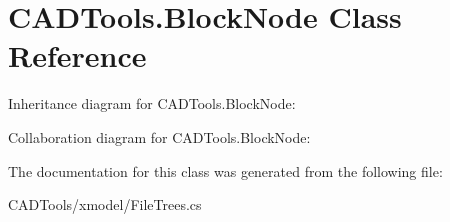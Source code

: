 \hypertarget{class_c_a_d_tools_1_1_block_node}{}\section{C\+A\+D\+Tools.\+Block\+Node Class Reference}
\label{class_c_a_d_tools_1_1_block_node}


Inheritance diagram for C\+A\+D\+Tools.\+Block\+Node\+:


Collaboration diagram for C\+A\+D\+Tools.\+Block\+Node\+:


The documentation for this class was generated from the following file\+:\begin{DoxyCompactItemize}
\item 
C\+A\+D\+Tools/xmodel/File\+Trees.\+cs\end{DoxyCompactItemize}
